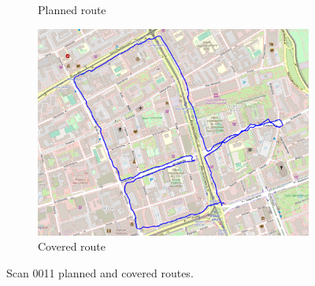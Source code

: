 \documentclass[a4paper,12pt]{book}
\begin{document}
\begin{enumerate}
\begin{figure}[H]
\begin{subfigure}{.88\textwidth}
			\caption{Planned route}
			\label{fig:a11}
		\end{subfigure}%
		\linebreak
		\begin{subfigure}{.88\textwidth}
			\centering
			\includegraphics[width=1\linewidth]{route_c11}
			\caption{Covered route}
			\label{fig:b11}
		\end{subfigure}
		\caption{Scan 0011 planned and covered routes.}
		\label{fig:fig11}
	\end{figure} 
\end{enumerate}
\end{document}
